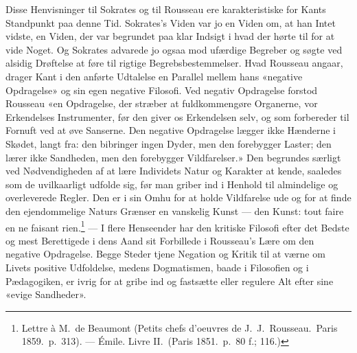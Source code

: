 \documentclass[12pt,a4paper]{article}
\begin{document}
Disse Henvisninger til Sokrates og til Rousseau ere karakteristiske for
Kants Standpunkt paa denne Tid. Sokrates's Viden var jo en Viden om, at
han Intet vidste, en Viden, der var begrundet paa klar Indsigt i hvad der
hørte til for at vide Noget. Og Sokrates advarede jo ogsaa mod ufærdige
Begreber og søgte ved alsidig Drøftelse at føre til rigtige
Begrebsbestemmelser. Hvad Rousseau angaar, drager Kant i den anførte
Udtalelse en Parallel mellem hans «negative Opdragelse» og sin egen
negative Filosofi. Ved negativ Opdragelse forstod Rousseau «en
Opdragelse, der stræber at fuldkommengøre Organerne, vor Erkendelses
Instrumenter, før den giver os Erkendelsen selv, og som forbereder til
Fornuft ved at øve Sanserne. Den negative Opdragelse lægger ikke Hænderne
i Skødet, langt fra: den bibringer ingen Dyder, men den forebygger
Laster; den lærer ikke Sandheden, men den forebygger Vildfarelser.» Den
begrundes særligt ved Nødvendigheden af at lære Individets Natur og
Karakter at kende, saaledes som de uvilkaarligt udfolde sig, før man
griber ind i Henhold til almindelige og overleverede Regler. Den er i sin
Omhu for at holde Vildfarelse ude og for at finde den ejendommelige
Naturs Grænser en vanskelig Kunst --- den Kunst: tout faire en ne
faisant rien.\footnote{Lettre à M.\ de Beaumont (Petits chefs
d'oeuvres de J.\ J.\ Rousseau.\ Paris 1859.\ p.\ 313). --- Émile.
Livre II.\ (Paris 1851.\ p.\ 80 f.; 116.)} --- I flere Henseender har den
kritiske Filosofi efter det Bedste og mest Berettigede i dens Aand sit
Forbillede i Rousseau's Lære om den negative Opdragelse. Begge Steder
tjene Negation og Kritik til at værne om Livets positive Udfoldelse,
medens Dogmatismen, baade i Filosofien og i Pædagogiken, er ivrig for at
gribe ind og fastsætte eller regulere Alt efter sine «evige Sandheder».
\end{document}
